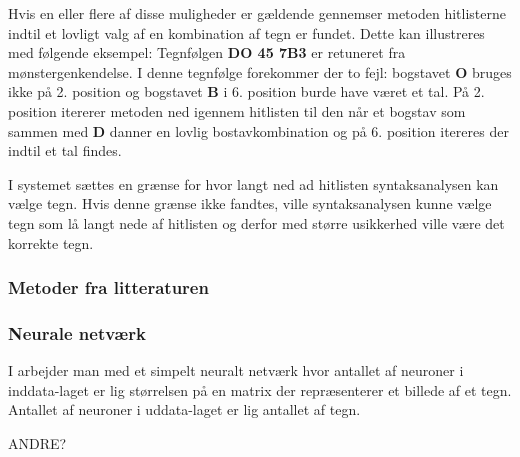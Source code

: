 Hvis en eller flere af disse muligheder er gældende gennemser metoden hitlisterne indtil et lovligt valg af en kombination af tegn er fundet. Dette kan illustreres med følgende eksempel: Tegnfølgen \textbf{DO 45 7B3} er retuneret fra mønstergenkendelse. I denne tegnfølge forekommer der to fejl: bogstavet \textbf{O} bruges ikke på 2. position og bogstavet \textbf{B} i 6. position burde have været et tal. På 2. position itererer metoden ned igennem hitlisten til den når et bogstav som sammen med \textbf{D} danner en lovlig bostavkombination og på 6. position itereres der indtil et tal findes.

I systemet sættes en grænse for hvor langt ned ad hitlisten syntaksanalysen kan vælge tegn. Hvis denne grænse ikke fandtes, ville syntaksanalysen kunne vælge tegn som lå langt nede af hitlisten og derfor med større usikkerhed ville være det korrekte tegn.


\subsubsection{Metoder fra litteraturen}

\subsubsection*{Neurale netværk}
I \cite{kwas} arbejder man med et simpelt neuralt netværk hvor antallet af neuroner i inddata-laget er lig størrelsen på en matrix der repræsenterer et billede af et tegn. Antallet af neuroner i uddata-laget er lig antallet af tegn.

ANDRE?
